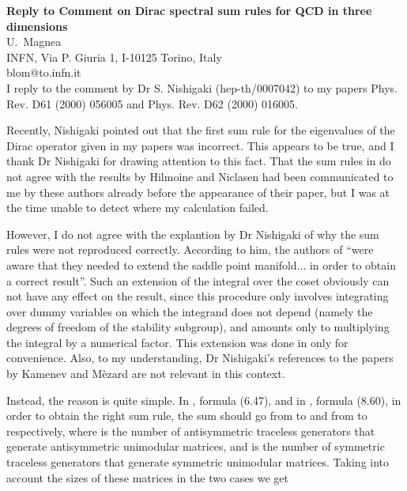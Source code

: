 \documentclass[a4paper,10pt]{article}
\begin{document}
\begin{center}
{\Large{\bf Reply to Comment on Dirac spectral sum rules for QCD 
in three dimensions
}}\\[2mm]

{
U.~Magnea \\
{\small INFN, Via P. Giuria 1, I-10125 Torino, Italy \\
blom@to.infn.it}
}\\[2mm]

{\small I reply to the comment by Dr S. Nishigaki (hep-th/0007042)
to my papers Phys. Rev. D61 (2000) 056005 and Phys. Rev. D62 (2000) 016005.
}
\end{center}

Recently, Nishigaki 
\cite{Comment} pointed out that the first sum rule for the
eigenvalues of the Dirac operator given in my papers \cite{QCD3_1,QCD3_2} 
was incorrect. This appears to be true, and I thank 
Dr Nishigaki for drawing attention to this fact. That the sum rules in 
\cite{QCD3_1,QCD3_2} do not agree with the results by Hilmoine and Niclasen 
\cite{ChrRu} had been communicated to me by these authors
already before the appearance of their paper, but I was at the time 
unable to detect where my calculation failed.

However, I do not agree with the explantion by Dr Nishigaki of why the
sum rules were not reproduced correctly.
According to him, the authors of \cite{V25}
``were aware that they needed to extend the saddle point manifold... 
in order to obtain a correct result''. Such an extension of the integral
over the coset obviously can not have any effect on the result, since
this procedure only involves integrating over dummy variables on which the
integrand does not depend (namely the degrees of freedom of the stability 
subgroup), and amounts only to multiplying the integral by a numerical
factor. This extension was done in \cite{V25} only for convenience. 
Also, to my understanding, Dr Nishigaki's references to the papers by Kamenev
and M{\`e}zard are not relevant in this context.

Instead, the reason is quite simple. In \cite{QCD3_1}, 
formula (6.47),
and in \cite{QCD3_2}, formula (8.60), in order to obtain the right sum rule, 
the sum should go from \coordHE{} to \coordHE{} and from \coordHE{} to \coordHE{} respectively,
where \coordHE{} is the number of antisymmetric traceless generators that
generate antisymmetric unimodular matrices, and \coordHE{} is the
number of symmetric traceless generators that generate symmetric 
unimodular matrices. Taking into account the sizes of these 
matrices in the two cases we get
\end{document}
